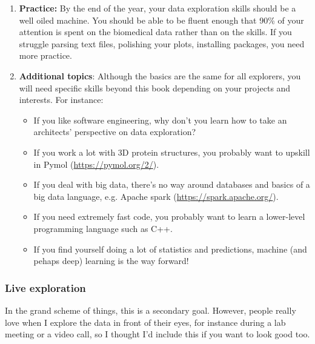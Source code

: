 \documentclass[12pt,a4paper,notitlepage,onecolumn]{article}
\begin{document}
\begin{enumerate}
\item \textbf{Practice:} By the end of the year, your data exploration skills should be a well oiled machine. You should be able to be fluent enough that 90\% of your attention is spent on the biomedical data rather than on the skills. If you struggle parsing text files, polishing your plots, installing packages, you need more practice.
\item \textbf{Additional topics}: Although the basics are the same for all explorers, you will need specific skills beyond this book depending on your projects and interests. For instance:
\begin{itemize}
\item If you like software engineering, why don't you learn how to take an architects' perspective on data exploration?
\item If you work a lot with 3D protein structures, you probably want to upskill in Pymol (\url{https://pymol.org/2/}).\item If you deal with big data, there's no way around databases and basics of a big data language, e.g. Apache spark (\url{https://spark.apache.org/}).
\item If you need extremely fast code, you probably want to learn a lower-level programming language such as C++.
\item If you find yourself doing a lot of statistics and predictions, machine (and pehaps deep) learning is the way forward!
\end{itemize}
\end{enumerate} 

\subsubsection{Live exploration}
In the grand scheme of things, this is a secondary goal. However, people really love when I explore the data in front of their eyes, for instance during a lab meeting or a video call, so I thought I'd include this if you want to look good too.
\end{document}

